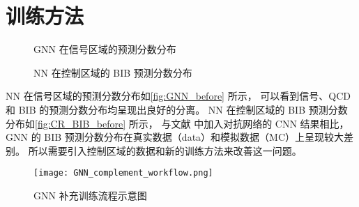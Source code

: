 \section{训练方法}
\begin{figure}[ht]
    \centering
    \hfill
    \hfill
    \caption{GNN 在信号区域的预测分数分布}
    \label{fig:GNN_before}
\end{figure}

\begin{figure}[ht]
    \centering
    \hfill
    \caption{NN 在控制区域的 BIB 预测分数分布}
    \label{fig:CR_BIB_before}
\end{figure}

NN 在信号区域的预测分数分布如\autoref{fig:GNN_before} 所示，
可以看到信号、QCD 和 BIB 的预测分数分布均呈现出良好的分离。
NN 在控制区域的 BIB 预测分数分布如\autoref{fig:CR_BIB_before} 所示，
与文献\cite{ATLAS:2022zhj} 中加入对抗网络的 CNN 结果相比，
GNN 的 BIB 预测分数分布在真实数据（data）和模拟数据（MC）上呈现较大差别。
所以需要引入控制区域的数据和新的训练方法来改善这一问题。

\begin{figure}[ht]
    \texttt{[image: GNN\_complement\_workflow.png]}
    \caption{GNN 补充训练流程示意图}
    \label{fig:GNN_complement_workflow}
\end{figure}


